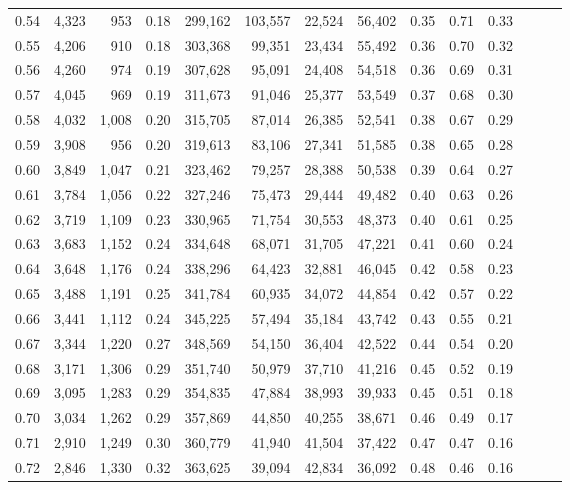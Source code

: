 \begin{tabular}{rrrrrrrrrrrrrr}
0.54 &  4,323 &    953 &  0.18 &  299,162 &  103,557 &  22,524 &  56,402 &  0.35 &  0.71 &      0.33 \\
0.55 &  4,206 &    910 &  0.18 &  303,368 &   99,351 &  23,434 &  55,492 &  0.36 &  0.70 &      0.32 \\
0.56 &  4,260 &    974 &  0.19 &  307,628 &   95,091 &  24,408 &  54,518 &  0.36 &  0.69 &      0.31 \\
0.57 &  4,045 &    969 &  0.19 &  311,673 &   91,046 &  25,377 &  53,549 &  0.37 &  0.68 &      0.30 \\
0.58 &  4,032 &  1,008 &  0.20 &  315,705 &   87,014 &  26,385 &  52,541 &  0.38 &  0.67 &      0.29 \\
0.59 &  3,908 &    956 &  0.20 &  319,613 &   83,106 &  27,341 &  51,585 &  0.38 &  0.65 &      0.28 \\
0.60 &  3,849 &  1,047 &  0.21 &  323,462 &   79,257 &  28,388 &  50,538 &  0.39 &  0.64 &      0.27 \\
0.61 &  3,784 &  1,056 &  0.22 &  327,246 &   75,473 &  29,444 &  49,482 &  0.40 &  0.63 &      0.26 \\
0.62 &  3,719 &  1,109 &  0.23 &  330,965 &   71,754 &  30,553 &  48,373 &  0.40 &  0.61 &      0.25 \\
0.63 &  3,683 &  1,152 &  0.24 &  334,648 &   68,071 &  31,705 &  47,221 &  0.41 &  0.60 &      0.24 \\
0.64 &  3,648 &  1,176 &  0.24 &  338,296 &   64,423 &  32,881 &  46,045 &  0.42 &  0.58 &      0.23 \\
0.65 &  3,488 &  1,191 &  0.25 &  341,784 &   60,935 &  34,072 &  44,854 &  0.42 &  0.57 &      0.22 \\
0.66 &  3,441 &  1,112 &  0.24 &  345,225 &   57,494 &  35,184 &  43,742 &  0.43 &  0.55 &      0.21 \\
0.67 &  3,344 &  1,220 &  0.27 &  348,569 &   54,150 &  36,404 &  42,522 &  0.44 &  0.54 &      0.20 \\
0.68 &  3,171 &  1,306 &  0.29 &  351,740 &   50,979 &  37,710 &  41,216 &  0.45 &  0.52 &      0.19 \\
0.69 &  3,095 &  1,283 &  0.29 &  354,835 &   47,884 &  38,993 &  39,933 &  0.45 &  0.51 &      0.18 \\
0.70 &  3,034 &  1,262 &  0.29 &  357,869 &   44,850 &  40,255 &  38,671 &  0.46 &  0.49 &      0.17 \\
0.71 &  2,910 &  1,249 &  0.30 &  360,779 &   41,940 &  41,504 &  37,422 &  0.47 &  0.47 &      0.16 \\
0.72 &  2,846 &  1,330 &  0.32 &  363,625 &   39,094 &  42,834 &  36,092 &  0.48 &  0.46 &      0.16 \\

\end{tabular}
